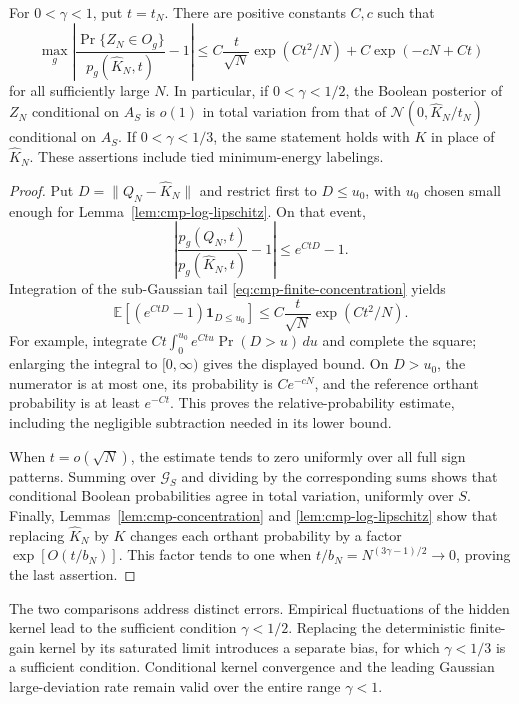 \begin{theorem}
\label{thm:cmp-relative}
For $0<\gamma<1$, put $t=t_N$. There are positive constants $C,c$
such that
\[
 \max_g\left|
 \frac{\Pr\{Z_N\in O_g\}}{p_g(\widehat K_N,t)}-1\right|
 \le C\frac{t}{\sqrt N}\exp(Ct^2/N)+C\exp(-cN+Ct)
\]
for all sufficiently large $N$. In particular, if $0<\gamma<1/2$,
the Boolean posterior of $Z_N$ conditional on $A_S$ is $o(1)$ in total
variation from that of
$\mathcal N(0,\widehat K_N/t_N)$ conditional on $A_S$.
If $0<\gamma<1/3$, the same statement holds with $K$ in place of
$\widehat K_N$. These assertions include tied minimum-energy labelings.
\end{theorem}

\begin{proof}
Put $D=\|Q_N-\widehat K_N\|$ and restrict first to $D\le u_0$,
with $u_0$ chosen small enough for
Lemma~\ref{lem:cmp-log-lipschitz}. On that event,
\[
 \left|\frac{p_g(Q_N,t)}{p_g(\widehat K_N,t)}-1\right|
 \le e^{CtD}-1.
\]
Integration of the sub-Gaussian tail
\eqref{eq:cmp-finite-concentration} yields
\[
 \mathbb E[(e^{CtD}-1)\mathbf 1_{D\le u_0}]
 \le C\frac{t}{\sqrt N}\exp(Ct^2/N).
\]
For example, integrate
$Ct\int_0^{u_0}e^{Ctu}\Pr(D>u)\,du$ and complete the square;
enlarging the integral to $[0,\infty)$ gives the displayed bound.
On $D>u_0$, the numerator is at most one, its probability is
$Ce^{-cN}$, and the reference orthant probability is at least
$e^{-Ct}$. This proves the relative-probability estimate, including
the negligible subtraction needed in its lower bound.

When $t=o(\sqrt N)$, the estimate tends to zero uniformly over all
full sign patterns. Summing over $\mathcal G_S$ and dividing by the
corresponding sums shows that conditional Boolean probabilities agree
in total variation, uniformly over $S$. Finally,
Lemmas~\ref{lem:cmp-concentration} and
\ref{lem:cmp-log-lipschitz} show that replacing $\widehat K_N$ by
$K$ changes each orthant probability by a factor
$\exp[O(t/b_N)]$. This factor tends to one when
$t/b_N=N^{(3\gamma-1)/2}\to0$, proving the last assertion.
\end{proof}

The two comparisons address distinct errors. Empirical fluctuations of
the hidden kernel lead to the sufficient condition $\gamma<1/2$.
Replacing the deterministic finite-gain kernel by its saturated limit
introduces a separate bias, for which $\gamma<1/3$ is a sufficient
condition. Conditional kernel convergence and the leading Gaussian
large-deviation rate remain valid over the entire range $\gamma<1$.

